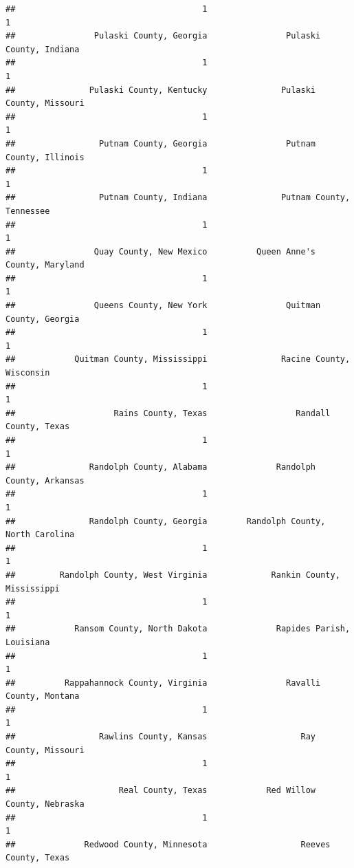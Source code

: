 \documentclass[
]{article}
\begin{document}
\begin{verbatim}
##                                      1                                      1 
##                Pulaski County, Georgia                Pulaski County, Indiana 
##                                      1                                      1 
##               Pulaski County, Kentucky               Pulaski County, Missouri 
##                                      1                                      1 
##                 Putnam County, Georgia                Putnam County, Illinois 
##                                      1                                      1 
##                 Putnam County, Indiana               Putnam County, Tennessee 
##                                      1                                      1 
##                Quay County, New Mexico          Queen Anne's County, Maryland 
##                                      1                                      1 
##                Queens County, New York                Quitman County, Georgia 
##                                      1                                      1 
##            Quitman County, Mississippi               Racine County, Wisconsin 
##                                      1                                      1 
##                    Rains County, Texas                  Randall County, Texas 
##                                      1                                      1 
##               Randolph County, Alabama              Randolph County, Arkansas 
##                                      1                                      1 
##               Randolph County, Georgia        Randolph County, North Carolina 
##                                      1                                      1 
##         Randolph County, West Virginia             Rankin County, Mississippi 
##                                      1                                      1 
##            Ransom County, North Dakota              Rapides Parish, Louisiana 
##                                      1                                      1 
##          Rappahannock County, Virginia                Ravalli County, Montana 
##                                      1                                      1 
##                 Rawlins County, Kansas                   Ray County, Missouri 
##                                      1                                      1 
##                     Real County, Texas            Red Willow County, Nebraska 
##                                      1                                      1 
##              Redwood County, Minnesota                   Reeves County, Texas 

\end{verbatim}
\end{document}
